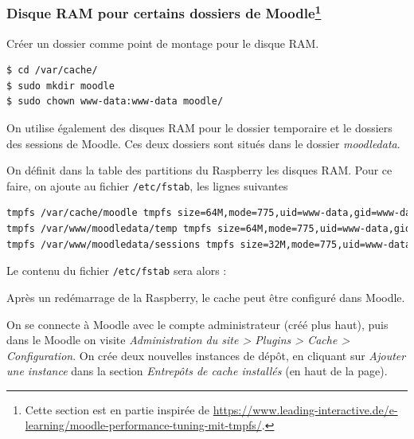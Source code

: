 \documentclass[11pt]{article}
\begin{document}
\subsubsection[Disque RAM pour certains dossiers de Moodle]{Disque RAM pour certains dossiers de Moodle\footnote{Cette section est en partie inspirée de \url{https://www.leading-interactive.de/e-learning/moodle-performance-tuning-mit-tmpfs/}.}}

Créer un dossier comme point de montage pour le disque RAM.
\begin{lstlisting}[language=bash]
$ cd /var/cache/
$ sudo mkdir moodle
$ sudo chown www-data:www-data moodle/
\end{lstlisting}

On utilise également des disques RAM pour le dossier temporaire et le dossiers des sessions de Moodle. Ces deux dossiers sont situés dans le dossier \emph{moodledata}.

On définit dans la table des partitions du Raspberry les disques RAM. Pour ce faire, on ajoute au fichier \lstinline{/etc/fstab}, les lignes suivantes
\begin{lstlisting}[language=bash]
tmpfs /var/cache/moodle tmpfs size=64M,mode=775,uid=www-data,gid=www-data 0 0
tmpfs /var/www/moodledata/temp tmpfs size=64M,mode=775,uid=www-data,gid=www-data 0 0
tmpfs /var/www/moodledata/sessions tmpfs size=32M,mode=775,uid=www-data,gid=www-data 0 0
\end{lstlisting}

%
Le contenu du fichier \lstinline{/etc/fstab} sera alors :


Après un redémarrage de la Raspberry, le cache peut être configuré dans Moodle.

On se connecte à Moodle avec le compte administrateur (créé plus haut), puis dans le Moodle on visite \emph{Administration du site > Plugins > Cache > Configuration}. On crée deux nouvelles instances de dépôt, en cliquant sur \emph{Ajouter une instance} dans la section \emph{Entrepôts de cache installés} (en haut de la page).
\end{document}
